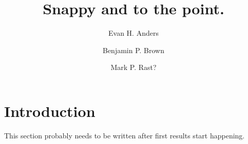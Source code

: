 \documentclass[twocolumn, amsmath, amsfonts, amssymb]{aastex62}
\begin{document}
\title{Snappy and to the point.}


\author{Evan H. Anders}
\author{Benjamin P. Brown}
\author{Mark P. Rast?}


\begin{abstract}
\end{abstract}


\section{Introduction} \label{sec:intro}
This section probably needs to be written after first results start happening.
%
%
%
%
%
\end{document}
